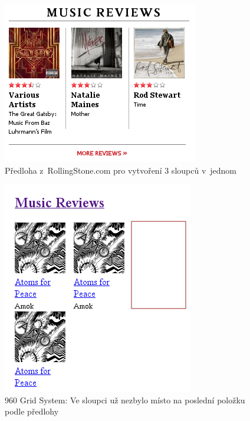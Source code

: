 \documentclass[thesis=B,czech]{FITthesis}[2012/06/26]
\begin{document}
\begin{figure}[h]
	\begin{center}
	\includegraphics[scale=1]{images/image12.png}
	\end{center}
	\caption{Předloha z~RollingStone.com pro vytvoření 3 sloupců v~jednom}
	\label{imgGS1}
\end{figure}
\begin{figure}[h]
	\begin{center}
	\includegraphics[scale=1]{images/image09.png}
	\end{center}
	\caption[Využití 960 Grid System]{960 Grid System: Ve sloupci už nezbylo místo na poslední položku podle předlohy}
	\label{imgGS2}
\end{figure}
\end{document}
